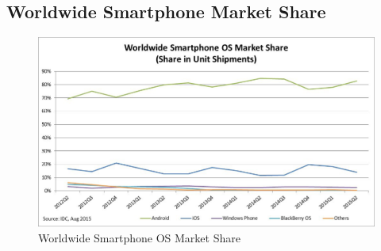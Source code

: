
\begin{landscape}
\chapter{Worldwide Smartphone Market Share}
\label{appendix:worldwidesmartphonemarketshare}

\begin{figure}[ht]
	\centering
	\includegraphics[scale=0.60]{images/phoneMarketShare.png}
	\caption{Worldwide Smartphone OS Market Share \citep{idcsmartphonereport}}
\end{figure}
\end{landscape}
